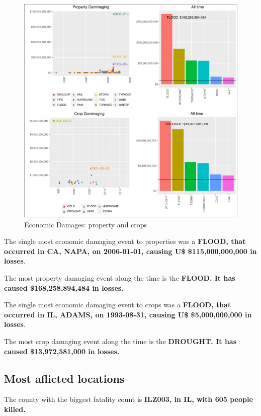 \documentclass[]{article}
\begin{document}
\begin{figure}[htbp]
\centering
\includegraphics{readme_files/figure-latex/economic-plot-1.pdf}
\caption{Economic Damages: property and crops}
\end{figure}

The single most economic damaging event to properties was a
\textbf{FLOOD, that occurred in CA, NAPA, on 2006-01-01, causing U\$
\$115,000,000,000 in losses}.

The most property damaging event along the time is the \textbf{FLOOD. It
has caused \$168,258,894,484 in losses.}

The single most economic damaging event to crops was a \textbf{FLOOD,
that occurred in IL, ADAMS, on 1993-08-31, causing U\$ \$5,000,000,000
in losses}.

The most crop damaging event along the time is the \textbf{DROUGHT. It
has caused \$13,972,581,000 in losses.}

\subsection{Most aflicted locations}\label{most-aflicted-locations-1}

The county with the biggest fatality count is \textbf{ILZ003, in IL,
with 605 people killed.}
\end{document}
